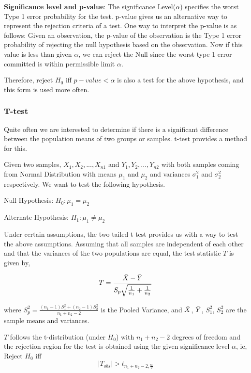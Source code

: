 \documentclass[fontsize=12 pt]{scrartcl}
\begin{document}
\textbf{Significance level and p-value}: The significance Level($\alpha$) specifies the worst Type 1 error probability for the test. p-value gives us an alternative way to represent the rejection criteria of a test. One way to interpret the p-value is as follows:
\newline
Given an observation, the p-value of the observation is the Type 1 error probability of rejecting the null hypothesis based on the observation. Now if this value is less than given $\alpha$, we can reject the Null since the worst type 1 error committed is within permissible limit $\alpha$.

Therefore, reject $H_0$ iff  $p-value <\alpha$ is also a test for the above hypothesis, and this form is used more often.
\citep [p.~405]{inference}

\subsubsection{T-test}
Quite often we are interested to determine if there is a significant difference between the population means of two groups or samples. t-test provides a method for this.

Given two samples, 
$ X_1, X_2, ... , X_{n1}$ and $Y_1, Y_2, ... , Y_{n2}$ with both samples coming from Normal Distribution with means $\mu_1$ and $\mu_2$ and variances $\sigma_1^2$ and $\sigma_2^2$ respectively. We want to test the following hypothesis.

Null Hypothesis: $H_0 : \mu_1 = \mu_2$

Alternate Hypothesis: $H_1 : \mu_1 \neq \mu_2$

Under certain assumptions, the two-tailed t-test provides us with a way to test the above assumptions. Assuming that all samples are independent of each other and that the variances of the two populations are equal, the test statistic $T$ is given by, 

\[ T = \frac{\Bar{X} - \Bar{Y}}{S_p \sqrt{\frac{1}{n_1} + \frac{1}{n_2}}} \]

where $S_p^2 = \frac{(n_1 - 1)S_1^2 + (n_2 - 1)S_2^2}{n_1 + n_2 - 2}  $ is the Pooled Variance, and $\Bar{X}$, $\Bar{Y}$, $S_1^2$, $S_2^2$ are the sample means and variances.

$T$ follows the t-distribution (under $H_0$) with $n_1 + n_2 - 2$ degrees of freedom and the rejection region for the test is obtained using the given significance level $\alpha$, ie, Reject $H_0$ iff
\[  |T_{obs}| > t_{n_1+n_2-2, \frac{\alpha}{2} } \]
\end{document}
